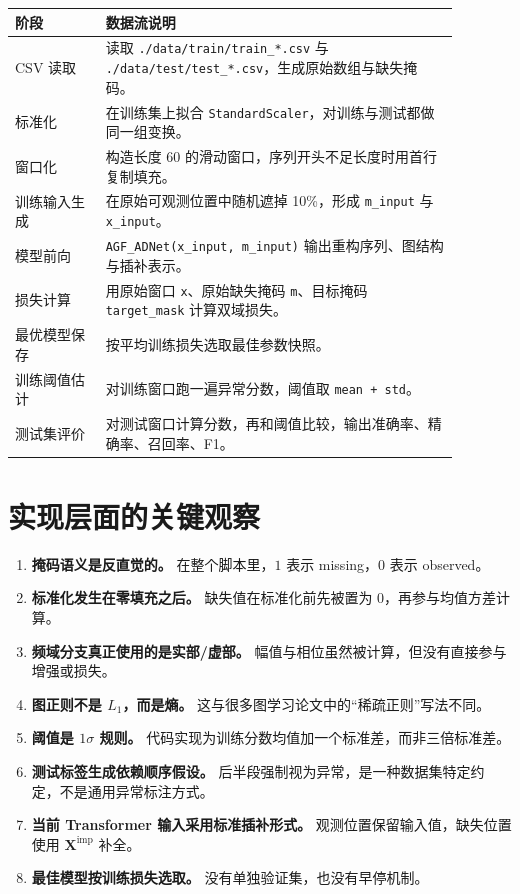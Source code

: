 \documentclass[UTF8]{ctexart}
\begin{document}
\begin{longtable}{>{\raggedright\arraybackslash}p{0.18\linewidth} >{\raggedright\arraybackslash}p{0.70\linewidth}}
\toprule
阶段 & 数据流说明 \\
\midrule
\endhead
CSV 读取 & 读取 \texttt{./data/train/train\_*.csv} 与 \texttt{./data/test/test\_*.csv}，生成原始数组与缺失掩码。 \\
标准化 & 在训练集上拟合 \texttt{StandardScaler}，对训练与测试都做同一组变换。 \\
窗口化 & 构造长度 60 的滑动窗口，序列开头不足长度时用首行复制填充。 \\
训练输入生成 & 在原始可观测位置中随机遮掉 10\%，形成 \texttt{m\_input} 与 \texttt{x\_input}。 \\
模型前向 & \texttt{AGF\_ADNet(x\_input, m\_input)} 输出重构序列、图结构与插补表示。 \\
损失计算 & 用原始窗口 \texttt{x}、原始缺失掩码 \texttt{m}、目标掩码 \texttt{target\_mask} 计算双域损失。 \\
最优模型保存 & 按平均训练损失选取最佳参数快照。 \\
训练阈值估计 & 对训练窗口跑一遍异常分数，阈值取 \texttt{mean + std}。 \\
测试集评价 & 对测试窗口计算分数，再和阈值比较，输出准确率、精确率、召回率、F1。 \\
\bottomrule
\end{longtable}

\section{实现层面的关键观察}

\begin{enumerate}
    \item \textbf{掩码语义是反直觉的。} 在整个脚本里，$1$ 表示 missing，$0$ 表示 observed。
    \item \textbf{标准化发生在零填充之后。} 缺失值在标准化前先被置为 0，再参与均值方差计算。
    \item \textbf{频域分支真正使用的是实部/虚部。} 幅值与相位虽然被计算，但没有直接参与增强或损失。
    \item \textbf{图正则不是 $L_1$，而是熵。} 这与很多图学习论文中的“稀疏正则”写法不同。
    \item \textbf{阈值是 $1\sigma$ 规则。} 代码实现为训练分数均值加一个标准差，而非三倍标准差。
    \item \textbf{测试标签生成依赖顺序假设。} 后半段强制视为异常，是一种数据集特定约定，不是通用异常标注方式。
    \item \textbf{当前 Transformer 输入采用标准插补形式。} 观测位置保留输入值，缺失位置使用 $\bm{X}^{\text{imp}}$ 补全。
    \item \textbf{最佳模型按训练损失选取。} 没有单独验证集，也没有早停机制。
\end{enumerate}
\end{document}
